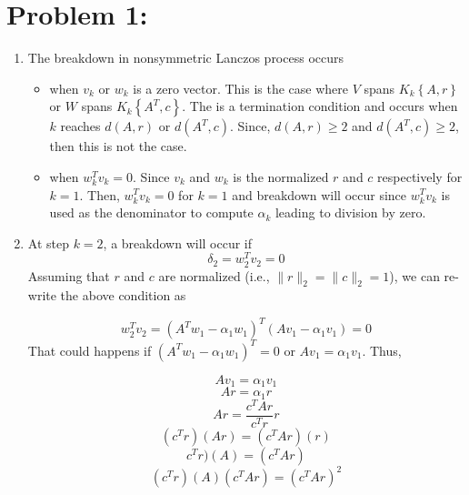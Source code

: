 \section*{Problem 1:}
\begin{enumerate}
\item The breakdown in nonsymmetric Lanczos process occurs
\begin{itemize}
\item when $v_{k}$ or $w_{k}$ is a zero vector. This is the case where $V$ spans $K_{k}
\left\lbrace A,r \right\rbrace$ or $W$ spans $K_{k}\left\lbrace A^{T},c \right\rbrace$. The is a termination condition and occurs when $k$ reaches $d(A,r)$ or $d(A^{T},c)$. Since, $d(A,r) \geq 2$ and $d(A^{T},c) \geq 2$, then this is not the case. 

\item when $w_{k}^{T}v_{k} =0$. Since $v_{k}$ and $w_{k}$ is the normalized $r$ and $c$ respectively for $k=1$. Then, $w_{k}^{T}v_{k} = 0$ for $k=1$ and breakdown will occur since $w_{k}^{T}v_{k}$ is used as the denominator to compute $\alpha_{k}$ leading to division by zero. 
\end{itemize}

\item At step $k = 2$, a breakdown will occur if 
$$
\delta_{2} = w_{2}^{T}v_{2} = 0
$$
Assuming that $r$ and $c$ are normalized (i.e., $\parallel r\parallel_{2} = \parallel c\parallel_{2} =1$), we can re-write the above condition as 

$$
w_{2}^{T}v_{2} = (A^{T}w_{1} - \alpha_{1}w_{1})^{T} (Av_{1} - \alpha_{1}v_{1}) = 0
$$
That could happens if  $(A^{T}w_{1} - \alpha_{1}w_{1})^{T}=0$ or $Av_{1} = \alpha_{1}v_{1}$. Thus, 

$$
Av_{1} = \alpha_{1}v_{1}
$$
$$
Ar = \alpha_{1}r
$$
$$
Ar = \frac{c^{T}Ar}{c^{T}r}r
$$
$$
(c^{T}r)(Ar) = (c^{T}Ar)(r)
$$
$$
c^{T}r)(A) = (c^{T}Ar)
$$
$$
(c^{T}r)(A)(c^{T}Ar) = (c^{T}Ar)^{2}
$$

\end{enumerate}
